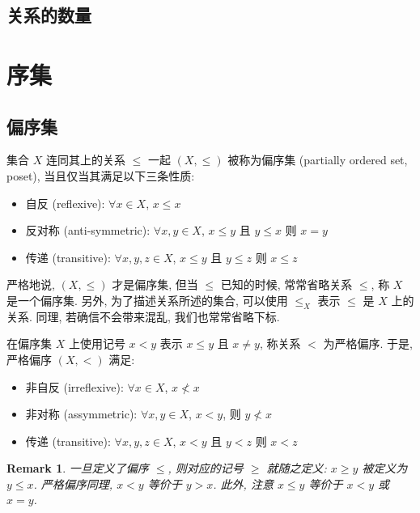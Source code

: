 \documentclass[UTF8]{ctexart}
\theoremstyle{mystyle}
\theoremstyle{myremark}
\newtheorem*{remark}{Remark}
\theoremstyle{plain}
\begin{document}
\subsection{关系的数量}


\section{序集}
\subsection{偏序集}
\begin{definition}
    集合 $ X $ 连同其上的关系 $ \le $ 一起 $ (X, \le) $ 被称为偏序集 (partially ordered set, poset), 当且仅当其满足以下三条性质:
    \begin{itemize}
        \item 自反 (reflexive): $ \forall x \in X $, $ x \le x $
        \item 反对称 (anti-symmetric): $ \forall x, y \in X $, $ x \le y $ 且 $ y \le x $ 则 $ x = y $
        \item 传递 (transitive): $ \forall x, y, z \in X $, $ x \le y $ 且 $ y \le z $ 则 $ x \le z $
    \end{itemize}
\end{definition}

严格地说, $ (X, \le) $ 才是偏序集, 但当 $ \le $ 已知的时候, 常常省略关系 $ \le $, 称 $ X $ 是一个偏序集. 另外, 为了描述关系所述的集合, 可以使用 $ \le_X $ 表示 $ \le $ 是 $ X $ 上的关系. 同理, 若确信不会带来混乱, 我们也常常省略下标.


\begin{definition}
    在偏序集 $ X $ 上使用记号 $ x < y $ 表示 $ x \le y $ 且 $ x \neq y $, 称关系 $ < $ 为严格偏序. 于是, 严格偏序 $ (X, <) $ 满足:
    \begin{itemize}
        \item 非自反 (irreflexive): $ \forall x \in X $, $ x \not < x $
        \item 非对称 (assymmetric): $ \forall x, y \in X $, $ x < y $, 则 $ y \not < x $
        \item 传递 (transitive): $ \forall x, y, z \in X $, $ x < y $ 且 $ y < z $ 则 $ x < z $
    \end{itemize}
\end{definition}

\begin{remark}
    一旦定义了偏序 $ \le $, 则对应的记号 $ \ge $ 就随之定义: $ x \ge y $ 被定义为 $ y \le x $. 严格偏序同理, $ x < y $ 等价于 $ y > x $. 此外, 注意 $ x \le y $ 等价于 $ x < y $ 或 $ x = y $.
\end{remark}
\end{document}
